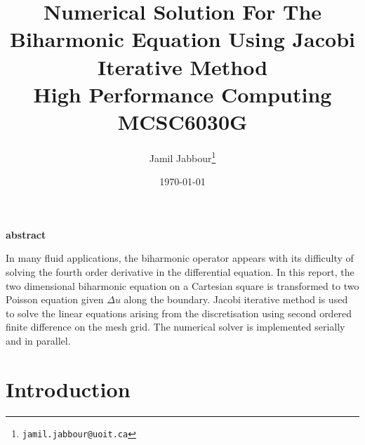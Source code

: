 
\doublespacing


\title{ Numerical Solution For The  Biharmonic Equation Using Jacobi Iterative Method\\
        High Performance Computing MCSC6030G\\
        }
\author{Jamil Jabbour\footnote{\tt jamil.jabbour@uoit.ca}}
\date{\today}
\maketitle

\begin{center}
\bf{abstract}
\end{center}
In many fluid applications, the biharmonic operator appears with its difficulty of solving the fourth order derivative in the differential equation. In this report, the two dimensional biharmonic equation on a Cartesian square is transformed to two Poisson equation given $\Delta u$ along the boundary. Jacobi iterative method is used to solve the linear equations arising from the discretisation using second ordered finite difference on the mesh grid. The numerical solver is implemented serially and in parallel.

\section{Introduction}

